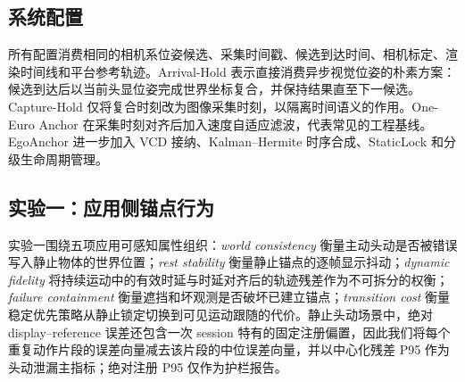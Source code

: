 \documentclass[9pt,twocolumn,letterpaper]{extarticle}
\begin{document}
\subsection{系统配置}

所有配置消费相同的相机系位姿候选、采集时间戳、候选到达时间、相机标定、渲染时间线和平台参考轨迹。Arrival-Hold 表示直接消费异步视觉位姿的朴素方案：候选到达后以当前头显位姿完成世界坐标复合，并保持结果直至下一候选。Capture-Hold 仅将复合时刻改为图像采集时刻，以隔离时间语义的作用。One-Euro Anchor 在采集时刻对齐后加入速度自适应滤波，代表常见的工程基线。EgoAnchor 进一步加入 VCD 接纳、Kalman--Hermite 时序合成、StaticLock 和分级生命周期管理。


\subsection{实验一：应用侧锚点行为}

实验一围绕五项应用可感知属性组织：\emph{world consistency} 衡量主动头动是否被错误写入静止物体的世界位置；\emph{rest stability} 衡量静止锚点的逐帧显示抖动；\emph{dynamic fidelity} 将持续运动中的有效时延与时延对齐后的轨迹残差作为不可拆分的权衡；\emph{failure containment} 衡量遮挡和坏观测是否破坏已建立锚点；\emph{transition cost} 衡量稳定优先策略从静止锁定切换到可见运动跟随的代价。静止头动场景中，绝对 display--reference 误差还包含一次 session 特有的固定注册偏置，因此我们将每个重复动作片段的误差向量减去该片段的中位误差向量，并以中心化残差 P95 作为头动泄漏主指标；绝对注册 P95 仅作为护栏报告。
\end{document}

